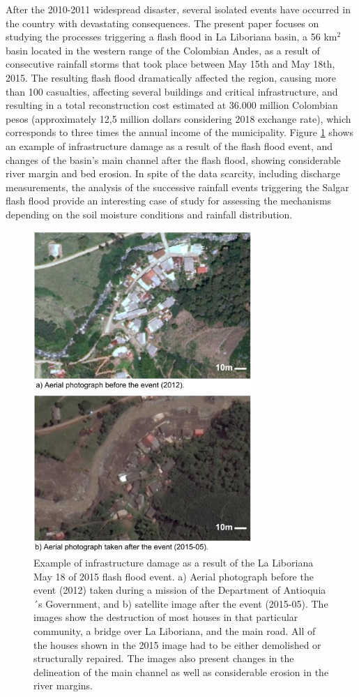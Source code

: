 \documentclass[hess, manuscript]{copernicus}
\begin{document}
After the  2010-2011 widespread disaster, several isolated events have occurred in the country with devastating consequences. The present paper focuses on studying the processes triggering a flash flood in La Liboriana basin,  a 56 km$^2$  basin located in the western range of the Colombian Andes, as a result of consecutive rainfall storms that took place between May 15th and May 18th, 2015. The resulting flash flood dramatically affected the region, causing more than 100 casualties,   affecting several buildings and critical infrastructure, and resulting in a total reconstruction cost estimated at 36.000 million Colombian pesos (approximately 12,5 million dollars considering 2018 exchange rate), which corresponds to three times the annual income of the municipality.  Figure \ref{fig:Antes_y_Despues} shows an example of infrastructure damage as a result of the flash flood event, and changes of the basin's main channel after the flash flood, showing considerable river margin and bed erosion. In spite of the data scarcity, including discharge measurements, the analysis of the successive rainfall events triggering the Salgar flash flood  provide an interesting case of study for assessing the mechanisms depending on the soil moisture conditions and rainfall distribution.\\


\begin{figure}[t]
    \centering
    \includegraphics[width=8.3cm]{Figures/Salgar_Before_After.png}
    \caption{Example of infrastructure damage as a result of the La Liboriana May 18 of 2015 flash flood event. a) Aerial photograph before the event (2012) taken during a mission of the Department of Antioquia´s Government, and b) satellite image after the event (2015-05). The images show the destruction of most houses in that particular community, a bridge over La Liboriana, and the main road.  All of the houses shown in the 2015 image had to be either demolished or structurally repaired. The images also present changes in the delineation of the main channel as well as considerable erosion in the river margins.}
    \label{fig:Antes_y_Despues}
\end{figure}
\end{document}
